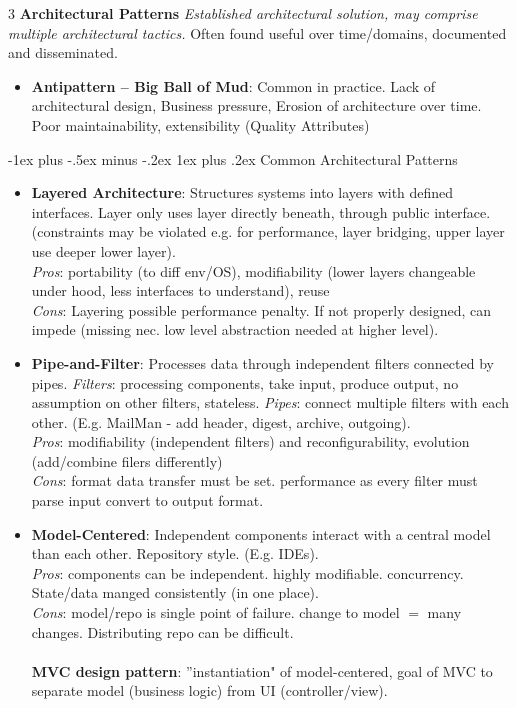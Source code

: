 \documentclass[a4paper, 10pt, landscape]{article}
\makeatletter
\renewcommand{\subsubsection}{\@startsection{subsubsection}{3}{0mm}%
                                {-1ex plus -.5ex minus -.2ex}%
                                {1ex plus .2ex}%
                                {\normalfont\small\bfseries}}
\makeatother
\begin{document}
\begin{multicols*}{3}
\textbf{Architectural Patterns}
\textit{Established architectural solution, may comprise multiple architectural tactics.} Often found useful over time/domains, documented and disseminated.
\begin{itemize}
\item \textbf{Antipattern -- Big Ball of Mud}: Common in practice. Lack of architectural design, Business pressure, Erosion of architecture over time. 
Poor maintainability, extensibility (Quality Attributes)
\end{itemize}

\subsubsection{Common Architectural Patterns}
\begin{itemize}
	\item \textbf{Layered Architecture}: Structures systems into layers with defined interfaces. Layer only uses layer directly beneath, through public interface. (constraints may be violated e.g. for performance, layer bridging, upper layer use deeper lower layer). \\
	 \textit{Pros}: portability (to diff env/OS), modifiability (lower layers changeable under hood, less interfaces to understand), reuse\\
	 \textit{Cons}: Layering possible performance penalty. If not properly designed, can impede (missing nec. low level abstraction needed at higher level).
	 
      \item \textbf{Pipe-and-Filter}: Processes data through independent filters connected by pipes. \textit{Filters}: processing components, take input, produce output, no assumption on other filters, stateless. \textit{Pipes}: connect multiple filters with each other. (E.g. MailMan - add header, digest, archive, outgoing). \\
      \textit{Pros}: modifiability (independent filters) and reconfigurability, evolution (add/combine filers differently) \\
      \textit{Cons}: format data transfer must be set. performance as every filter must parse input convert to output format.
      
      \item \textbf{Model-Centered}: Independent components interact with a central model than each other. Repository style. (E.g. IDEs). \\
      \textit{Pros}: components can be independent. highly modifiable. concurrency. State/data manged consistently (in one place).  \\
      \textit{Cons}: model/repo is single point of failure. change to model $=$ many changes. Distributing repo can be difficult. \\  \\
      \textbf{MVC design pattern}: ''instantiation" of model-centered, goal of MVC to separate model (business logic) from UI (controller/view).
      

\end{itemize}
\end{multicols*}
\end{document}
